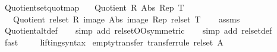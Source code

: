 \begin{isabellebody}
\ Quotient{\isacharunderscore}{\kern0pt}set{\isacharbrackleft}{\kern0pt}quot{\isacharunderscore}{\kern0pt}map{\isacharbrackright}{\kern0pt}{\isacharcolon}{\kern0pt}\isanewline
\ \ \ {\isachardoublequoteopen}Quotient\ R\ Abs\ Rep\ T{\isachardoublequoteclose}\isanewline
\ \ \ {\isachardoublequoteopen}Quotient\ {\isacharparenleft}{\kern0pt}rel{\isacharunderscore}{\kern0pt}set\ R{\isacharparenright}{\kern0pt}\ {\isacharparenleft}{\kern0pt}image\ Abs{\isacharparenright}{\kern0pt}\ {\isacharparenleft}{\kern0pt}image\ Rep{\isacharparenright}{\kern0pt}\ {\isacharparenleft}{\kern0pt}rel{\isacharunderscore}{\kern0pt}set\ T{\isacharparenright}{\kern0pt}{\isachardoublequoteclose}\isanewline
%
\isadelimproof
\ \ %
\endisadelimproof
%
\isatagproof
{}\isamarkupfalse%
\ assms\ \isamarkupfalse%
\ Quotient{\isacharunderscore}{\kern0pt}alt{\isacharunderscore}{\kern0pt}def{}\isanewline
\ \ \isamarkupfalse%
\ {\isacharparenleft}{\kern0pt}simp\ add{\isacharcolon}{\kern0pt}\ rel{\isacharunderscore}{\kern0pt}set{\isacharunderscore}{\kern0pt}OO{\isacharbrackleft}{\kern0pt}symmetric{\isacharbrackright}{\kern0pt}{\isacharparenright}{\kern0pt}\isanewline
\ \ \isamarkupfalse%
\ {\isacharparenleft}{\kern0pt}simp\ add{\isacharcolon}{\kern0pt}\ rel{\isacharunderscore}{\kern0pt}set{\isacharunderscore}{\kern0pt}def{\isacharparenright}{\kern0pt}\isanewline
\ \ \isamarkupfalse%
\ fast\isanewline
\ \ \isamarkupfalse%
%
\endisatagproof
{\isafoldproof}%
%
\isadelimproof
%
\endisadelimproof
%
\isadelimdocument
%
\endisadelimdocument
%
\isatagdocument
%
\isamarkuptrue%
%
\isamarkuptrue%
%
\endisatagdocument
{\isafolddocument}%
%
\isadelimdocument
%
\endisadelimdocument
{}\isamarkupfalse%
\ \ lifting{\isacharunderscore}{\kern0pt}syntax\isanewline
{}\isanewline
\isanewline
{}\isamarkupfalse%
\ empty{\isacharunderscore}{\kern0pt}transfer\ {\isacharbrackleft}{\kern0pt}transfer{\isacharunderscore}{\kern0pt}rule{\isacharbrackright}{\kern0pt}{\isacharcolon}{\kern0pt}\ {\isachardoublequoteopen}{\isacharparenleft}{\kern0pt}rel{\isacharunderscore}{\kern0pt}set\ A{\isacharparenright}{\kern0pt}\ {\isacharbraceleft}{\kern0pt}{\isacharbraceright}{\kern0pt}\ {\isacharbraceleft}{\kern0pt}{\isacharbraceright}{\kern0pt}{\isachardoublequoteclose}\isanewline
%
\isadelimproof

\end{isabellebody}
